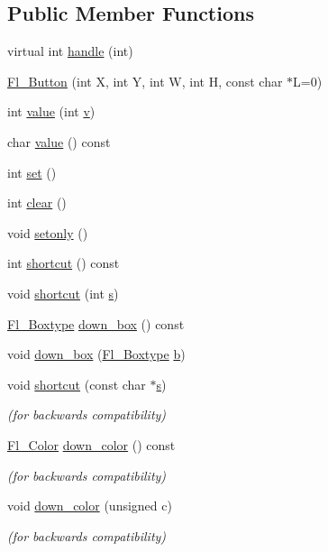 \subsection*{Public Member Functions}
\begin{DoxyCompactItemize}
\item 
virtual int \hyperlink{class_fl___button_a85a9bcd4943f577e6eb68f054ae3c80c}{handle} (int)
\item 
\hyperlink{class_fl___button_af943da36e7d89f77172799ee6da91f03}{Fl\+\_\+\+Button} (int X, int Y, int W, int H, const char $\ast$L=0)
\item 
int \hyperlink{class_fl___button_aceffc03f6b14f180a1639e26c91f9a4a}{value} (int \hyperlink{forms_8_h_a3b90d5a73541ab9402511d87bed076ef}{v})
\item 
char \hyperlink{class_fl___button_acdee089d984b1aaea066b9b4ef300816}{value} () const
\item 
int \hyperlink{class_fl___button_aa6dfe6b7a8e12b804f90726586fe87d4}{set} ()
\item 
int \hyperlink{class_fl___button_a22833ffc9190f26c67896662a0b11f9a}{clear} ()
\item 
void \hyperlink{class_fl___button_ad56f03bef37bd9d2a8a115188da3149d}{setonly} ()
\item 
int \hyperlink{class_fl___button_ada2b633b47d6ef80ebb79b78bd7d8473}{shortcut} () const
\item 
void \hyperlink{class_fl___button_ad0c694762b456cbb3c42927b2129fdd4}{shortcut} (int \hyperlink{forms_8_h_a672b4f0a8c8a6db61068c721f799d87f}{s})
\item 
\hyperlink{_enumerations_8_h_ae48bf9070f8541de17829f54ccacc6bc}{Fl\+\_\+\+Boxtype} \hyperlink{class_fl___button_ae5e15aced7a8dba0435f0751d0a2ce37}{down\+\_\+box} () const
\item 
void \hyperlink{class_fl___button_a970d494d8fefcfd73308354ebba14b8f}{down\+\_\+box} (\hyperlink{_enumerations_8_h_ae48bf9070f8541de17829f54ccacc6bc}{Fl\+\_\+\+Boxtype} \hyperlink{forms_8_h_a0ba06a290a384fa06b1b90745827dae2}{b})
\item 
void \hyperlink{class_fl___button_a3b8d2f683517cffe1c9b55dc7271a0d1}{shortcut} (const char $\ast$\hyperlink{forms_8_h_a672b4f0a8c8a6db61068c721f799d87f}{s})
\begin{DoxyCompactList}\small\item\em (for backwards compatibility) \end{DoxyCompactList}\item 
\hyperlink{_enumerations_8_h_a8b762953646f8abee866061f1af78a6a}{Fl\+\_\+\+Color} \hyperlink{class_fl___button_a63b6b9d5b0d44e230f0c8674c8c3f7aa}{down\+\_\+color} () const
\begin{DoxyCompactList}\small\item\em (for backwards compatibility) \end{DoxyCompactList}\item 
void \hyperlink{class_fl___button_aefa18a3cb511ca9ab8b38a0ae20084b4}{down\+\_\+color} (unsigned c)
\begin{DoxyCompactList}\small\item\em (for backwards compatibility) \end{DoxyCompactList}\end{DoxyCompactItemize}
